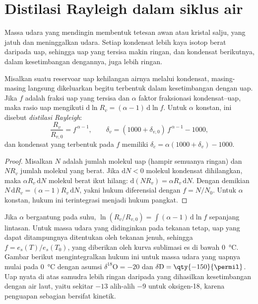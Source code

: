 \section{Distilasi Rayleigh dalam siklus air}\label{sec:b3:stable-isotopes:rayleigh}

Massa udara yang mendingin membentuk tetesan awan atau kristal salju, yang jatuh dan
meninggalkan udara. Setiap kondensat lebih kaya isotop berat daripada uap, sehingga
uap yang tersisa makin ringan, dan kondensat berikutnya, dalam kesetimbangan dengannya, juga
lebih ringan.

\begin{proposition}\label{prop:b3:stable-isotopes:rayleigh-distillation}
Misalkan suatu reservoar uap kehilangan airnya melalui kondensat, masing-masing langsung dikeluarkan begitu
terbentuk dalam kesetimbangan dengan uap. Jika $f$ adalah fraksi uap yang
tersisa dan $\alpha$ faktor fraksionasi kondensat--uap, maka
rasio uap mengikuti $\mathrm d\ln R_v = (\alpha - 1)\,\mathrm d\ln f$. Untuk
$\alpha$ konstan, ini disebut \emph{distilasi
Rayleigh}:
\[
\frac{R_v}{R_{v,0}} = f^{\,\alpha - 1}, \qquad
\delta_v = (1000 + \delta_{v,0})\,f^{\,\alpha - 1} - 1000,
\]
dan kondensat yang terbentuk pada $f$ memiliki $\delta_c = \alpha(1000 + \delta_v) - 1000$.
\end{proposition}

\begin{proof}
Misalkan $N$ adalah jumlah molekul uap (hampir semuanya ringan) dan $N R_v$
jumlah molekul yang berat. Jika $\mathrm dN < 0$ molekul kondensat dihilangkan,
maka $\alpha R_v\,\mathrm dN$ molekul berat ikut hilang: $\mathrm d(NR_v) = \alpha
R_v\,\mathrm dN$. Dengan demikian $N\,\mathrm dR_v = (\alpha - 1)R_v\,\mathrm dN$, yakni
hukum diferensial dengan $f = N/N_0$. Untuk $\alpha$ konstan, hukum ini terintegrasi
menjadi hukum pangkat.
\end{proof}

Jika $\alpha$ bergantung pada suhu, $\ln(R_v/R_{v,0}) = \int(\alpha - 1)\,
\mathrm d\ln f$ sepanjang lintasan. Untuk massa udara yang didinginkan pada tekanan tetap,
uap yang dapat ditampungnya ditentukan oleh tekanan jenuh, sehingga $f =
e_s(T)/e_s(T_0)$, yang diberikan oleh kurva sublimasi es di bawah
\qty{0}{\celsius}. Gambar berikut mengintegralkan hukum ini untuk massa udara yang
uapnya mulai pada \qty{0}{\celsius} dengan asumsi $\delta^{18}\mathrm O = -20$
dan $\delta\mathrm D = \qty{-150}{\permil}$. Uap nyata di atas samudra lebih
ringan daripada yang dihasilkan kesetimbangan dengan air laut, yaitu sekitar $-13$ alih-alih
\qty{-9}{\permil} untuk oksigen-18, karena penguapan sebagian bersifat kinetik.

